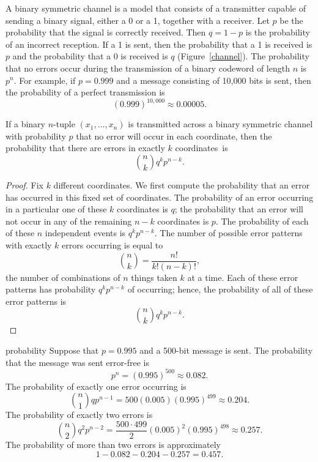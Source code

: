 
 
A {\bfi binary symmetric channel\/}
is a model that consists of a transmitter capable of sending a binary 
signal, either a 0 or a 1, together with a receiver. Let $p$ be the 
probability that the signal is correctly
received. Then $q=1-p$ is the probability of an incorrect reception.
If a 1 is sent, then the probability that a 1 is received is $p$ and
the probability that a 0 is received is $q$ (Figure~\ref{channel}).
The probability that no errors occur during the transmission of a binary
codeword of length $n$ is $p^{n}$. For example, if $p=0.999$ and a
message consisting of 10,000 bits is sent, then the probability of a
perfect transmission is 
\[
(0.999)^{10,000} \approx 0.00005.
\]
 
 
\begin{theorem}
If a binary $n$-tuple $(x_{1}, \ldots, x_{n})$ is transmitted across a
binary symmetric channel with probability $p$ that no error will occur
in each coordinate, then the probability that there are errors in
exactly $k$ coordinates~is
\[
\binom{n}{k} q^kp^{n-k}.
\]
\end{theorem}
 
 
\begin{proof}
Fix $k$ different coordinates. We first compute the probability that
an error has occurred in this fixed set of coordinates. The
probability of an error occurring in a particular one of these $k$
coordinates is $q$; the probability that an error will not occur
in any of the remaining $n-k$ coordinates is $p$. The
probability of each of these $n$ independent events is
$q^{k}p^{n-k}$. The number of possible error patterns with exactly $k$
errors occurring is equal to 
\[
\binom{n}{k} 
= \frac{n!}{k!(n-k)!},
\]
the number of combinations of $n$ things taken $k$ at a time. Each of
these error patterns has probability $q^{k}p^{n-k}$ of occurring;
hence, the probability of all of these error patterns is
\[
\binom{n}{k} 
q^{k}p^{n-k}.
\]
\end{proof}
 
 
\begin{example}{probability}
Suppose that $p = 0.995$ and a 500-bit message is sent. The
probability that the message was sent error-free is 
\[
p^{n} = (0.995)^{500} \approx 0.082.
\]
The probability of exactly one error occurring is
\[
\binom{n}{1} 
qp^{n-1}= 500(0.005)(0.995)^{499}
\approx 0.204.
\]
The probability of exactly two errors is
\[
\binom{n}{2} 
q^{2}p^{n-2}=
\frac{500 \cdot 499}{2}(0.005)^{2}(0.995)^{498} \approx
0.257.
\]
The probability of more than two errors is approximately
\[
1-0.082-0.204 -0.257=0.457.
\]
\end{example}
 
